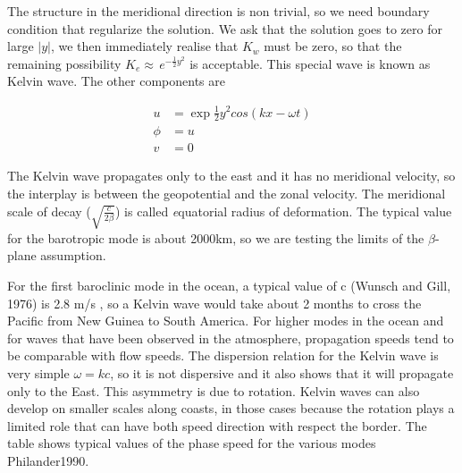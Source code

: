 The structure in the meridional direction is non trivial, so we need
boundary condition that regularize the solution. We ask that the
solution goes to zero for large \(|y|\), we then immediately realise
that \(K_w\) must be zero, so that the remaining possibility
\(K_e  \approx \,e^{-\frac{1}{2}y^2}\) is acceptable. This special wave
is known as Kelvin wave. The other components are

\[\begin{aligned}
u &= \exp{\frac{1}{2}y^2}cos(kx-\omega t)\\
\phi &= u\\
v&=0
\end{aligned}\]

The Kelvin wave propagates only to the east and it has no meridional
velocity, so the interplay is between the geopotential and the zonal
velocity. The meridional scale of decay (\(\sqrt{\frac{c}{2\beta}}\)) is
called \emph{e}quatorial radius of deformation. The typical value for
the barotropic mode is about 2000km, so we are testing the limits of the
\(\beta\)-plane assumption.

For the first baroclinic mode in the ocean, a typical value of c (Wunsch
and Gill, 1976) is 2.8 m/s , so a Kelvin wave would take about 2 months
to cross the Pacific from New Guinea to South America. For higher modes
in the ocean and for waves that have been observed in the atmosphere,
propagation speeds tend to be comparable with flow speeds. The
dispersion relation for the Kelvin wave is very simple \(\omega = k c\),
so it is not dispersive and it also shows that it will propagate only to
the East. This asymmetry is due to rotation. Kelvin waves can also
develop on smaller scales along coasts, in those cases because the
rotation plays a limited role that can have both speed direction with
respect the border. The table shows typical values of the phase speed
for the various modes Philander1990.


